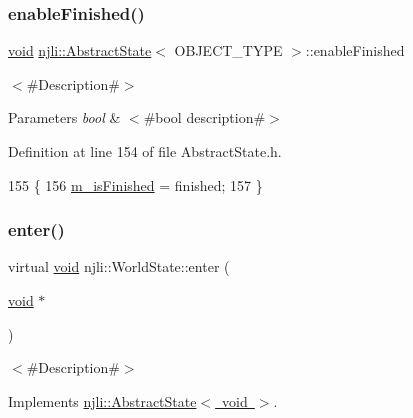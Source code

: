 \subsubsection{\texorpdfstring{enable\+Finished()}{enableFinished()}}
{\footnotesize\ttfamily \mbox{\hyperlink{_thread_8h_af1e856da2e658414cb2456cb6f7ebc66}{void}} \mbox{\hyperlink{classnjli_1_1_abstract_state}{njli\+::\+Abstract\+State}}$<$ O\+B\+J\+E\+C\+T\+\_\+\+T\+Y\+PE $>$\+::enable\+Finished}

$<$\#\+Description\#$>$


\begin{DoxyParams}{Parameters}
{\em bool} & $<$\#bool description\#$>$ \\
\hline
\end{DoxyParams}


Definition at line 154 of file Abstract\+State.\+h.


\begin{DoxyCode}
155   \{
156     \mbox{\hyperlink{classnjli_1_1_abstract_state_a445a5d1ac7572b8b01b81937c89e960c}{m\_isFinished}} = finished;
157   \}
\end{DoxyCode}
\mbox{\label{classnjli_1_1_world_state_ad126287c45283df721b113c6a08a00f9}} 
\subsubsection{\texorpdfstring{enter()}{enter()}}
{\footnotesize\ttfamily virtual \mbox{\hyperlink{_thread_8h_af1e856da2e658414cb2456cb6f7ebc66}{void}} njli\+::\+World\+State\+::enter (\begin{DoxyParamCaption}\item[{\mbox{\hyperlink{_thread_8h_af1e856da2e658414cb2456cb6f7ebc66}{void}} $\ast$}]{ }\end{DoxyParamCaption})\hspace{0.3cm}{\ttfamily [virtual]}}

$<$\#\+Description\#$>$ 

Implements \mbox{\hyperlink{classnjli_1_1_abstract_state_ae10e437370dcfc3261ec0b9f350f16d8}{njli\+::\+Abstract\+State$<$ void $>$}}.

\mbox{\label{classnjli_1_1_world_state_a567bac6ea9dc0445e0cb7a14a8a2e271}} 
